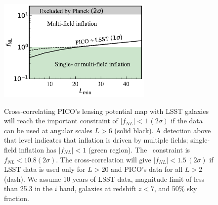 \documentclass[PICOReport.tex]{subfiles}
\begin{document}

\begin{figure}[h]
\hspace{-0.in}
\parbox{3.0in}{{
\includegraphics[width=2.95in]{images/PICO_fnl_lmin_PICOv4.1b_deproj0_SENS0_LSST10yrGoldWithDropouts.pdf} } }   %
\hspace{0.in}
\parbox{3.4in}{
\caption{\captiontext
Cross-correlating PICO's lensing potential map with LSST galaxies will reach the important constraint of $|f_{NL}|<1\, (2\sigma)$  if the data can be used at  angular scales $L > 6$ (solid black). A detection above that level indicates that inflation is driven by multiple fields; single-field inflation has $|f_{NL}|<1$ (green region). The \planck\ constraint is $f_{NL} < 10.8 (2\sigma)$. The cross-correlation will give $|f_{NL}|<1.5\, (2\sigma)$ if LSST data is used only for $L>20$ and PICO's data for all $L>2$ (dash). We assume 10 years of LSST data, magnitude limit of less than 25.3 in the $i$ band, galaxies at redshift $z<7$, and 50\% sky fraction. 
\label{fig:fnlconstraint}
} }
\vspace{-0.1in}
\end{figure}
\end{document}
